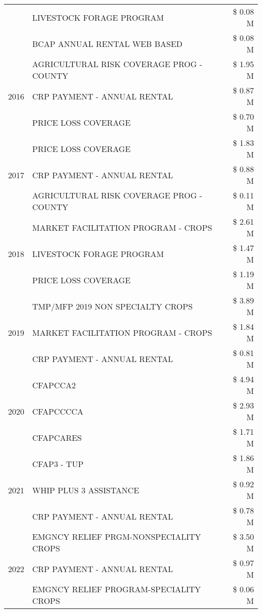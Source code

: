 \begin{tabular}{llr}
 & LIVESTOCK FORAGE PROGRAM & \$ 0.08 M \\
 & BCAP ANNUAL RENTAL WEB BASED & \$ 0.08 M \\
\cline{1-3}
\multirow[t]{3}{*}{2016} & AGRICULTURAL RISK COVERAGE PROG - COUNTY & \$ 1.95 M \\
 & CRP PAYMENT - ANNUAL RENTAL & \$ 0.87 M \\
 & PRICE LOSS COVERAGE & \$ 0.70 M \\
\cline{1-3}
\multirow[t]{3}{*}{2017} & PRICE LOSS COVERAGE & \$ 1.83 M \\
 & CRP PAYMENT - ANNUAL RENTAL & \$ 0.88 M \\
 & AGRICULTURAL RISK COVERAGE PROG - COUNTY & \$ 0.11 M \\
\cline{1-3}
\multirow[t]{3}{*}{2018} & MARKET FACILITATION PROGRAM - CROPS & \$ 2.61 M \\
 & LIVESTOCK FORAGE PROGRAM & \$ 1.47 M \\
 & PRICE LOSS COVERAGE & \$ 1.19 M \\
\cline{1-3}
\multirow[t]{3}{*}{2019} & TMP/MFP 2019 NON SPECIALTY CROPS & \$ 3.89 M \\
 & MARKET FACILITATION PROGRAM - CROPS & \$ 1.84 M \\
 & CRP PAYMENT - ANNUAL RENTAL & \$ 0.81 M \\
\cline{1-3}
\multirow[t]{3}{*}{2020} & CFAPCCA2 & \$ 4.94 M \\
 & CFAPCCCCA & \$ 2.93 M \\
 & CFAPCARES & \$ 1.71 M \\
\cline{1-3}
\multirow[t]{3}{*}{2021} & CFAP3 - TUP & \$ 1.86 M \\
 & WHIP PLUS 3 ASSISTANCE & \$ 0.92 M \\
 & CRP PAYMENT - ANNUAL RENTAL & \$ 0.78 M \\
\cline{1-3}
\multirow[t]{3}{*}{2022} & EMGNCY RELIEF PRGM-NONSPECIALITY CROPS & \$ 3.50 M \\
 & CRP PAYMENT - ANNUAL RENTAL & \$ 0.97 M \\
 & EMGNCY RELIEF PROGRAM-SPECIALITY CROPS & \$ 0.06 M \\
\cline{1-3}
\bottomrule
\end{tabular}
